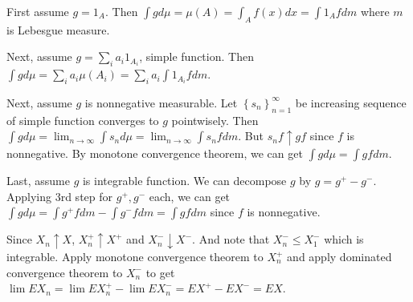 \begin{problem}[1.6.8] \hfill

	First assume $g = 1_A$. Then $\int g d\mu = \mu(A) = \int_A f(x)dx = \int 1_A f dm$ where $m$ is Lebesgue measure.
	
	Next, assume $g = \sum_i a_i 1_{A_i}$, simple function. Then $\int g d\mu = \sum_i a_i \mu\left( A_i \right) = \sum_i a_i \int 1_{A_i}f dm$.

	Next, assume $g$ is nonnegative measurable. Let $\left\{ s_n \right\}_{n=1}^{\infty}$ be increasing sequence of simple function converges to $g$ pointwisely. Then $\int g d\mu = \lim_{n\rightarrow \infty} \int s_n d\mu = \lim_{n\rightarrow \infty} \int s_n f dm$. But $s_n f \uparrow gf$ since $f$ is nonnegative. By monotone convergence theorem, we can get $\int g d\mu = \int g f dm$.

	Last, assume $g$ is integrable function. We can decompose $g$ by $g = g^+ - g^-$. Applying 3rd step for $g^+, g^-$ each, we can get $\int gd\mu = \int g^+ f dm - \int g^- f dm = \int gf dm$ since $f$ is nonnegative.
	
\end{problem}

\begin{problem}[1.6.13] \hfill

	Since $X_n \uparrow X$, $X_n^+ \uparrow X^+$ and $X_n^- \downarrow X^-$. And note that $X_n^- \leq X_1^-$ which is integrable. Apply monotone convergence theorem to $X_n^+$ and apply dominated convergence theorem to $X_n^-$ to get $\lim EX_n = \lim EX_n^+ - \lim EX_n^- = EX^+ - EX^- = EX$.
	
\end{problem}


